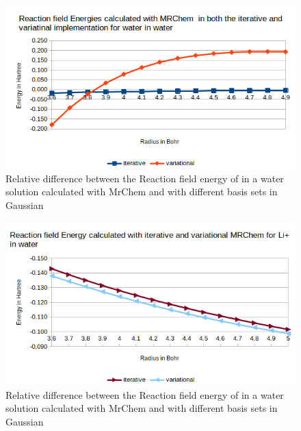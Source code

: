 \documentclass[../master_thesis.tex]{subfiles}
\begin{document}
\begin{figure}[h!]
  \centering
  \includegraphics[width=0.75\linewidth]{img/watvarEr.png}
  \caption{Relative difference between the Reaction field energy of  in a water solution calculated with MrChem
  and with different basis sets in Gaussian}
  \label{fig:watvarEr}
\end{figure}

\begin{figure}[h!]
  \centering
  \includegraphics[width=0.75\linewidth]{img/lipvarEr.png}
  \caption{Relative difference between the Reaction field energy of  in a water solution calculated with MrChem
  and with different basis sets in Gaussian}
  \label{fig:lipvarEr}
\end{figure}
\end{document}
